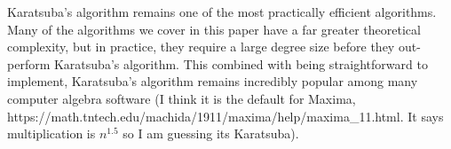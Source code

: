 \medskip



Karatsuba's algorithm remains one of the most practically efficient algorithms. Many of the algorithms we cover in this paper have a far greater theoretical complexity, but in practice, they require a large degree size before they out-perform Karatsuba's algorithm. This combined with being straightforward to implement, Karatsuba's algorithm remains incredibly popular among many computer algebra software (I think it is the default for Maxima, https://math.tntech.edu/machida/1911/maxima/help/maxima\_11.html. It says multiplication is $n^{1.5}$ so I am guessing its Karatsuba).

